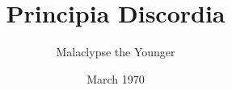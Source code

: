 \documentclass[10pt]{book}
\begin{document}
\author{Malaclypse the Younger}
\title{Principia Discordia}
\date{March 1970}

\frontmatter
\cleardoublepage
\begin{titlepage}

\end{titlepage}




\cleardoublepage


\mainmatter




\backmatter
\printindex
\end{document}
